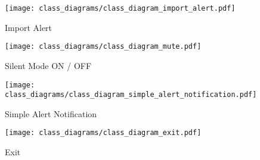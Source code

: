 \begin{figure}[]
	\centering
    \caption{Import Alert}\label{fig:cls_import_alert}
    \texttt{[image: class\_diagrams/class\_diagram\_import\_alert.pdf]}
\end{figure}

\begin{figure}[]
	\centering
    \caption{Silent Mode ON / OFF}\label{fig:cls_silent_mode}
    \texttt{[image: class\_diagrams/class\_diagram\_mute.pdf]}
\end{figure}

\begin{figure}[]
	\centering
    \caption{Simple Alert Notification}\label{fig:cls_simple_alert_notification}
    \texttt{[image: class\_diagrams/class\_diagram\_simple\_alert\_notification.pdf]}
\end{figure}

\begin{figure}[]
	\centering
    \caption{Exit}\label{fig:cls_exit}
    \texttt{[image: class\_diagrams/class\_diagram\_exit.pdf]}
\end{figure}
